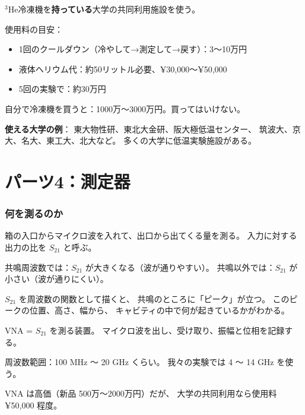 \documentclass[12pt,a4paper]{article}
\begin{document}
\begin{kanenobox}[冷却器のコスト]
$^3$He冷凍機を\textbf{持っている}大学の共同利用施設を使う。

使用料の目安：
\begin{itemize}
\item 1回のクールダウン（冷やして→測定して→戻す）：3〜10万円
\item 液体ヘリウム代：約50リットル必要、¥30,000〜¥50,000
\item 5回の実験で：約30万円
\end{itemize}

自分で冷凍機を買うと：1000万〜3000万円。買ってはいけない。

\textbf{使える大学の例}：
東大物性研、東北大金研、阪大極低温センター、
筑波大、京大、名大、東工大、北大など。
多くの大学に低温実験施設がある。
\end{kanenobox}

\part{パーツ4：測定器}

\section{何を測るのか}

\begin{naruhodox}[S$_{21}$ パラメータ]
箱の入口からマイクロ波を入れて、出口から出てくる量を測る。
入力に対する出力の比を $S_{21}$ と呼ぶ。

共鳴周波数では：$S_{21}$ が大きくなる（波が通りやすい）。
共鳴以外では：$S_{21}$ が小さい（波が通りにくい）。

$S_{21}$ を周波数の関数として描くと、
共鳴のところに「ピーク」が立つ。
このピークの位置、高さ、幅から、
キャビティの中で何が起きているかがわかる。
\end{naruhodox}

\begin{naruhodox}
VNA = $S_{21}$ を測る装置。
マイクロ波を出し、受け取り、振幅と位相を記録する。

周波数範囲：100 MHz 〜 20 GHz くらい。
我々の実験では 4 〜 14 GHz を使う。

VNA は高価（新品 500万〜2000万円）だが、
大学の共同利用なら使用料 ¥50,000 程度。
\end{naruhodox}
\end{document}
